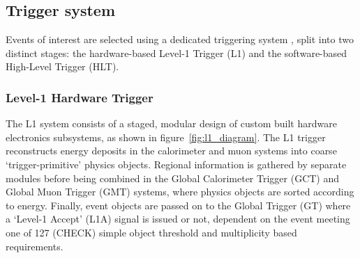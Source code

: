\subsection{Trigger system}
Events of interest are selected using a dedicated triggering system \cite{tridasTDR},
split into two distinct stages: the hardware-based Level-1 Trigger (L1) and
the software-based High-Level Trigger (HLT).

\subsubsection{Level-1 Hardware Trigger}

The L1 system consists of a staged, modular design of custom built hardware 
electronics subsystems, as shown in figure~\ref{fig:l1_diagram}. 
The L1 trigger reconstructs energy deposits in the calorimeter and muon systems
into coarse `trigger-primitive' physics objects.
Regional information is gathered by separate modules 
before being combined in the Global Calorimeter Trigger (GCT) and Global Muon 
Trigger (GMT) systems, where physics objects are sorted according to energy. 
Finally, event objects are passed on to the Global Trigger (GT) where a 
`Level-1 Accept' (L1A) signal is issued or not, dependent on the event meeting 
one of 127 (CHECK) simple object threshold and multiplicity based requirements.

